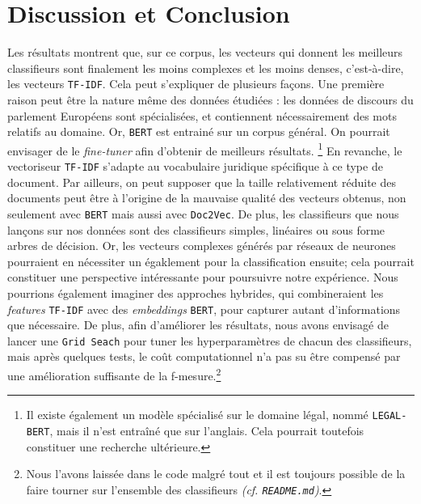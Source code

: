 \section{Discussion et Conclusion}

Les résultats montrent que, sur ce corpus, les vecteurs qui donnent les meilleurs classifieurs sont finalement les moins complexes et les moins denses, c'est-à-dire, les vecteurs \texttt{TF-IDF}. Cela peut s'expliquer de plusieurs façons. Une première raison peut être la nature même des données étudiées : les données de discours du parlement Européens sont spécialisées, et contiennent nécessairement des mots relatifs au domaine. Or, \texttt{BERT} est entrainé sur un corpus général. On pourrait envisager de le \textit{fine-tuner} afin d'obtenir de meilleurs résultats.  \footnote{Il existe également un modèle spécialisé sur le domaine légal, nommé \texttt{LEGAL-BERT}, mais il n'est entraîné que sur l'anglais. Cela pourrait toutefois constituer une recherche ultérieure.} En revanche, le vectoriseur \texttt{TF-IDF} s'adapte au vocabulaire juridique spécifique à ce type de document. Par ailleurs, on peut supposer que la taille relativement réduite des documents peut être à l'origine de la mauvaise qualité des vecteurs obtenus, non seulement avec \texttt{BERT} mais aussi avec \texttt{Doc2Vec}. De plus, les classifieurs que nous lançons sur nos données sont des classifieurs simples, linéaires ou sous forme arbres de décision. Or, les vecteurs complexes générés par réseaux de neurones pourraient en nécessiter un égaklement pour la classification ensuite; cela pourrait constituer une perspective intéressante pour poursuivre notre expérience. Nous pourrions également imaginer des approches hybrides, qui combineraient les \textit{features} \texttt{TF-IDF} avec des \textit{embeddings }\texttt{BERT}, pour capturer autant d'informations que nécessaire. De plus, afin d'améliorer les résultats, nous avons envisagé de lancer une \texttt{Grid Seach} pour tuner les hyperparamètres de chacun des classifieurs, mais après quelques tests, le coût computationnel n'a pas su être compensé par une amélioration suffisante de la f-mesure.\footnote{Nous l'avons laissée dans le code malgré tout et il est toujours possible de la faire tourner sur l'ensemble des classifieurs \textit{(cf. \texttt{README.md})}.} 